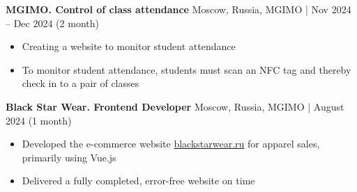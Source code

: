 \textbf{MGIMO. Control of class attendance} \hfill Moscow, Russia, MGIMO | Nov 2024 – Dec 2024 (2 month)
\begin{itemize}[noitemsep, topsep=0pt, partopsep=0pt, parsep=0pt]
    \item Creating a website to monitor student attendance
    \item To monitor student attendance, students must scan an NFC tag and thereby check in to a pair of classes
\end{itemize}

\textbf{Black Star Wear. Frontend Developer} \hfill Moscow, Russia, MGIMO | August 2024 (1 month)
\begin{itemize}[noitemsep, topsep=0pt, partopsep=0pt, parsep=0pt]
    \item Developed the e-commerce website \href{https://blackstarwear.ru}{blackstarwear.ru} for apparel sales, primarily using Vue.js
    \item Delivered a fully completed, error-free website on time
\end{itemize}
